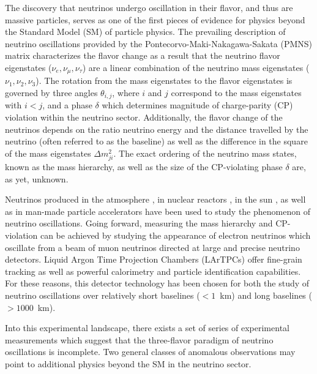 

The discovery that neutrinos undergo oscillation in their flavor, and thus are massive particles, serves as one of the first pieces of evidence for physics beyond the Standard Model (SM) of particle physics. The prevailing description of neutrino oscillations provided by the Pontecorvo-Maki-Nakagawa-Sakata (PMNS) matrix characterizes the flavor change as a result that the neutrino flavor eigenstates ($\nu_{e}, \nu_{\mu}, \nu_{\tau}$) are a linear combination of the neutrino mass eigenstates ($\nu_{1}, \nu_{2}, \nu_{3}$). The rotation from the mass eigenstates to the flavor eigenstates is governed by three angles $\theta_{i,j}$, where $i$ and $j$ correspond to the mass eigenstates with $i < j$, and a phase $\delta$ which determines magnitude of charge-parity (CP) violation within the neutrino sector. Additionally, the flavor change of the neutrinos depends on the ratio neutrino energy and the distance travelled by the neutrino (often referred to as the baseline) as well as the difference in the square of the mass eigenstates $\Delta m_{ji}^{2}$. The exact ordering of the neutrino mass states, known as the mass hierarchy, as well as the size of the CP-violating phase $\delta$ are, as yet, unknown.

Neutrinos produced in the atmosphere \cite{No1, No2, No3}, in nuclear reactors \cite{No4, No5, No6}, in the sun \cite{No7, No8, No9}, as well as in man-made particle accelerators \cite{No10, No11, No12} have been used to study the phenomenon of neutrino oscillations. Going forward, measuring the mass hierarchy and CP-violation can be achieved by studying the appearance of electron neutrinos which oscillate from a beam of muon neutrinos directed at large and precise neutrino detectors. Liquid Argon Time Projection Chambers (LArTPCs) offer fine-grain tracking as well as powerful calorimetry and particle identification capabilities. For these reasons, this detector technology has been chosen for both the study of neutrino oscillations over relatively short baselines ($<1$~km) and long baselines ($>1000$~km).

Into this experimental landscape, there exists a set of series of experimental measurements which suggest that the three-flavor paradigm of neutrino oscillations is incomplete. Two general classes of anomalous observations may point to additional physics beyond the SM  in the neutrino sector.


